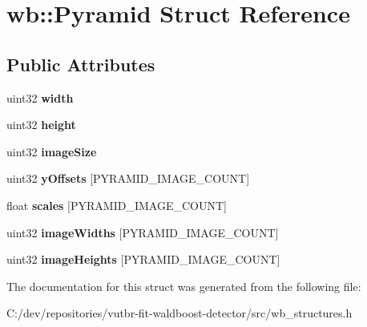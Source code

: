 \hypertarget{structwb_1_1_pyramid}{}\section{wb\+:\+:Pyramid Struct Reference}
\label{structwb_1_1_pyramid}
\subsection*{Public Attributes}
\begin{DoxyCompactItemize}
\item 
\hypertarget{structwb_1_1_pyramid_abc2ad840f24f09390dd664ac9fe4e80a}{}uint32 {\bfseries width}\label{structwb_1_1_pyramid_abc2ad840f24f09390dd664ac9fe4e80a}

\item 
\hypertarget{structwb_1_1_pyramid_afe207093ac79822b001471bf53a30f06}{}uint32 {\bfseries height}\label{structwb_1_1_pyramid_afe207093ac79822b001471bf53a30f06}

\item 
\hypertarget{structwb_1_1_pyramid_a24602d51ad40e5a3921aa3c528ab69d1}{}uint32 {\bfseries image\+Size}\label{structwb_1_1_pyramid_a24602d51ad40e5a3921aa3c528ab69d1}

\item 
\hypertarget{structwb_1_1_pyramid_a0f81dd30b5db51ce6f8b2fa8d6f01fc4}{}uint32 {\bfseries y\+Offsets} \mbox{[}P\+Y\+R\+A\+M\+I\+D\+\_\+\+I\+M\+A\+G\+E\+\_\+\+C\+O\+U\+N\+T\mbox{]}\label{structwb_1_1_pyramid_a0f81dd30b5db51ce6f8b2fa8d6f01fc4}

\item 
\hypertarget{structwb_1_1_pyramid_a992b98f7c9020fe45d234992ed272251}{}float {\bfseries scales} \mbox{[}P\+Y\+R\+A\+M\+I\+D\+\_\+\+I\+M\+A\+G\+E\+\_\+\+C\+O\+U\+N\+T\mbox{]}\label{structwb_1_1_pyramid_a992b98f7c9020fe45d234992ed272251}

\item 
\hypertarget{structwb_1_1_pyramid_a87fef7728d9b590d12580f1c1d8b0a5c}{}uint32 {\bfseries image\+Widths} \mbox{[}P\+Y\+R\+A\+M\+I\+D\+\_\+\+I\+M\+A\+G\+E\+\_\+\+C\+O\+U\+N\+T\mbox{]}\label{structwb_1_1_pyramid_a87fef7728d9b590d12580f1c1d8b0a5c}

\item 
\hypertarget{structwb_1_1_pyramid_a778882951adc319196d1e7b23e272bcd}{}uint32 {\bfseries image\+Heights} \mbox{[}P\+Y\+R\+A\+M\+I\+D\+\_\+\+I\+M\+A\+G\+E\+\_\+\+C\+O\+U\+N\+T\mbox{]}\label{structwb_1_1_pyramid_a778882951adc319196d1e7b23e272bcd}

\end{DoxyCompactItemize}


The documentation for this struct was generated from the following file\+:\begin{DoxyCompactItemize}
\item 
C\+:/dev/repositories/vutbr-\/fit-\/waldboost-\/detector/src/wb\+\_\+structures.\+h\end{DoxyCompactItemize}
